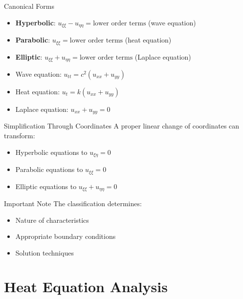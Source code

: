\documentclass{beamer}
\begin{document}
\begin{frame}{Canonical Forms}
    \begin{itemize}
        \item \textbf{Hyperbolic}: $u_{\xi\xi} - u_{\eta\eta} = \text{lower order terms}$ (wave equation)
        \item \textbf{Parabolic}: $u_{\xi\xi} = \text{lower order terms}$ (heat equation)
        \item \textbf{Elliptic}: $u_{\xi\xi} + u_{\eta\eta} = \text{lower order terms}$ (Laplace equation)
    \end{itemize}
    
    \begin{examples}
        \begin{itemize}
            \item Wave equation: $u_{tt} = c^2(u_{xx} + u_{yy})$
            \item Heat equation: $u_t = k(u_{xx} + u_{yy})$
            \item Laplace equation: $u_{xx} + u_{yy} = 0$
        \end{itemize}
    \end{examples}
\end{frame}

\begin{frame}{Simplification Through Coordinates}
    A proper linear change of coordinates can transform:
    \begin{itemize}
        \item Hyperbolic equations to $u_{\xi\eta} = 0$
        \item Parabolic equations to $u_{\xi\xi} = 0$
        \item Elliptic equations to $u_{\xi\xi} + u_{\eta\eta} = 0$
    \end{itemize}
    
    \begin{alertblock}{Important Note}
        The classification determines:
        \begin{itemize}
            \item Nature of characteristics
            \item Appropriate boundary conditions
            \item Solution techniques
        \end{itemize}
    \end{alertblock}
\end{frame}


\section{Heat Equation Analysis}
\end{document}
